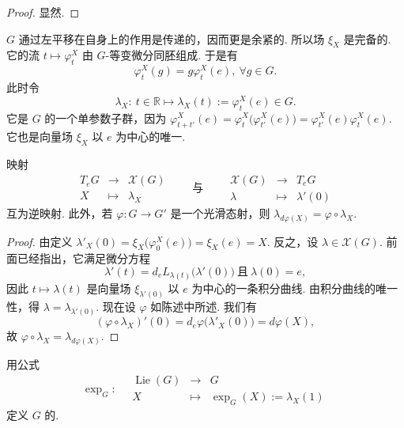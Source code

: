 \begin{proof}
显然.
\end{proof}

$G$ 通过左平移在自身上的作用是传递的，因而更是余紧的. 所以场 $\xi_{X}$ 是完备的. 它的流 $t\mapsto\varphi^{X}_{t}$ 由 $G$-等变微分同胚组成. 于是有
\[
\varphi^{X}_{t}(g)=g\varphi^{X}_{t}(e),\ \forall g\in G.
\]
此时令
\[
\lambda_{X}:\ t\in\mathbb R\mapsto\lambda_{X}(t):=\varphi^{X}_{t}(e)\in G.
\]
它是 $G$ 的一个单参数子群，因为 $\varphi^{X}_{t+t'}(e)=\varphi^{X}_{t}\bigl(\varphi^{X}_{t'}(e)\bigr)=\varphi^{X}_{t'}(e)\varphi^{X}_{t}(e)$. 它也是向量场 $\xi_{X}$ 以 $e$ 为中心的唯一.

\begin{proposition}\label{prop:lie-1-7-6}
映射
\[
\begin{array}{rcl}
T_{e}G & \longrightarrow & \mathscr X(G)\\
X & \longmapsto & \lambda_{X}
\end{array}
\qquad\text{与}\qquad
\begin{array}{rcl}
\mathscr X(G) & \longrightarrow & T_{e}G\\
\lambda & \longmapsto & \lambda'(0)
\end{array}
\]
互为逆映射. 此外，若 $\varphi:G\longrightarrow G'$ 是一个光滑态射，则 $\lambda_{d\varphi(X)}=\varphi\circ\lambda_{X}$.
\end{proposition}

\begin{proof}
由定义 $\lambda'_{X}(0)=\xi_{X}\bigl(\varphi^{X}_{0}(e)\bigr)=\xi_{X}(e)=X$. 反之，设 $\lambda\in\mathscr X(G)$. 前面已经指出，它满足微分方程
\[
\lambda'(t)=d_{e}L_{\lambda(t)}\bigl(\lambda'(0)\bigr)\ \text{且}\ \lambda(0)=e,
\]
因此 $t\mapsto\lambda(t)$ 是向量场 $\xi_{\lambda'(0)}$ 以 $e$ 为中心的一条积分曲线. 由积分曲线的唯一性，得 $\lambda=\lambda_{\lambda'(0)}$.
现在设 $\varphi$ 如陈述中所述. 我们有
\[
(\varphi\circ\lambda_{X})'(0)=d_{e}\varphi\bigl(\lambda'_{X}(0)\bigr)=d\varphi(X),
\]
故 $\varphi\circ\lambda_{X}=\lambda_{d\varphi(X)}$.
\end{proof}

\begin{definition}\label{def:lie-1-7-7}
用公式
\[
\exp_{G}:\quad
\begin{array}{rcl}
\operatorname{Lie}(G) & \longrightarrow & G\\
X & \longmapsto & \exp_{G}(X):=\lambda_{X}(1)
\end{array}
\]
定义 $G$ 的.
\end{definition}

